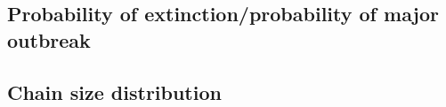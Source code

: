 \documentclass{imammb}
\numberwithin{equation}{section}
\begin{document}





\subsection{Probability of extinction/probability of major outbreak}

\subsection{Chain size distribution}

\end{document}
